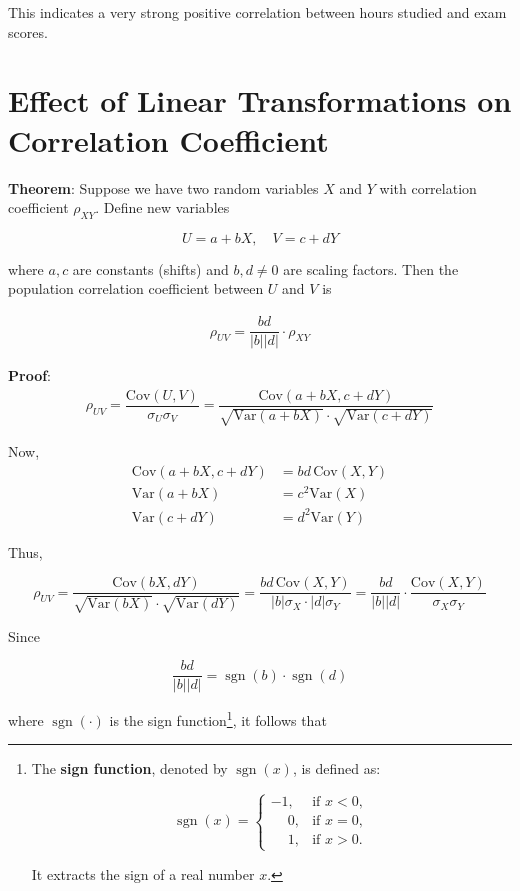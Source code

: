 \documentclass[twoside]{book}
\begin{document}
This indicates a very strong positive correlation between hours studied and exam scores.

\section{Effect of Linear Transformations on Correlation Coefficient}

\begin{textbox}
\textbf{Theorem}: Suppose we have two random variables \(X\) and \(Y\) with correlation coefficient $\rho_{XY}$. Define new variables

\[
U = a + bX, \quad V = c + dY
\]

where \(a, c\) are constants (shifts) and \(b, d \neq 0\) are scaling factors. Then the population correlation coefficient between \(U\) and \(V\) is

\begin{align*}
\rho_{UV} =  \dfrac{bd}{|b||d|} \cdot \rho_{XY}
\end{align*}
\end{textbox}
\textbf{Proof}:
\begin{align*}
\rho_{UV} =  \dfrac{\mathrm{Cov}(U,V)}{\sigma_U \sigma_V} = \dfrac{\mathrm{Cov}(a + bX, c + dY)}{\sqrt{\mathrm{Var}(a + bX)} \cdot \sqrt{\mathrm{Var}(c + dY)}}
\end{align*}

Now,
\begin{align*}
\mathrm{Cov}(a + bX, c + dY) &= bd\, \mathrm{Cov}(X,Y)\\
\mathrm{Var}(a + bX) &= c^2 \mathrm{Var}(X)\\
\mathrm{Var}(c + dY) &= d^2 \mathrm{Var}(Y)
\end{align*}

Thus,

$$\rho_{UV}
= \dfrac{\mathrm{Cov}(bX, dY)}{\sqrt{\mathrm{Var}(bX)}\cdot \sqrt{\mathrm{Var}(dY)}}
= \dfrac{bd \, \mathrm{Cov}(X, Y)}{|b| \sigma_X \cdot |d| \sigma_Y}
= \dfrac{bd}{|b||d|} \cdot \frac{\mathrm{Cov}(X, Y)}{\sigma_X \sigma_Y}$$

Since

\[
\dfrac{bd}{|b||d|} = \operatorname{sgn}(b) \cdot \operatorname{sgn}(d)
\]

where \(\operatorname{sgn}(\cdot)\) is the sign function\footnote{The \textbf{sign function}, denoted by \(\operatorname{sgn}(x)\), is defined as:

	\[
	\operatorname{sgn}(x) =
	\begin{cases}
	-1, & \text{if } x < 0, \\
	\phantom{-}0, & \text{if } x = 0, \\
	\phantom{-}1, & \text{if } x > 0.
	\end{cases}
	\]

	It extracts the sign of a real number \(x\).}, it follows that
\end{document}
